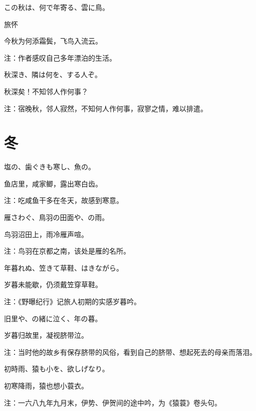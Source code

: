 \begin{haiku}
    {\FH この秋は、何で年寄る、雲に鳥。}

    {\FK 旅怀}

    {\FK 今秋为何添霜鬓，飞鸟入流云。}

    {\FT 注：作者感叹自己多年漂泊的生活。}
\end{haiku}

\begin{haiku}
    {\FH 秋深き、隣は何を、する人ぞ。}

    {\FK 秋深矣！不知邻人作何事？}

    {\FT 注：宿晚秋，邻人寂然，不知何人作何事，寂寥之情，难以排遣。}
\end{haiku}

\section{\FK 冬}

\setcounter{haikucounter}{0}

\begin{haiku}
    {\FH 塩の、歯ぐきも寒し、魚の。}

    {\FK 鱼店里，咸家鲫，露出寒白齿。}

    {\FT 注：吃咸鱼干多在冬天，故感到寒意。}
\end{haiku}

\begin{haiku}
    {\FH 雁さわぐ、鳥羽の田面や、の雨。}

    {\FK 鸟羽沼田上，雨冷雁声喧。}

    {\FT 注：鸟羽在京都之南，该处是雁的名所。}
\end{haiku}

\begin{haiku}
    {\FH 年暮れぬ、笠きて草鞋、はきながら。}

    {\FK 岁暮未能歇，仍须戴笠穿草鞋。}

    {\FT 注：《野曝纪行》记旅人初期的实感岁暮吟。}
\end{haiku}

\begin{haiku}
    {\FH 旧里や、の緒に泣く、年の暮。}

    {\FK 岁暮归故里，凝视脐带泣。}

    {\FT 注：当时他的故乡有保存脐带的风俗，看到自己的脐带、想起死去的母亲而落泪。}
\end{haiku}

\begin{haiku}
    {\FH 初時雨、猿も小を、欲しげなり。}

    {\FK 初寒降雨，猿也想小蓑衣。}

    {\FT 注：一六八九年九月末，伊势、伊贺间的途中吟，为《猿蓑》卷头句。}
\end{haiku}


